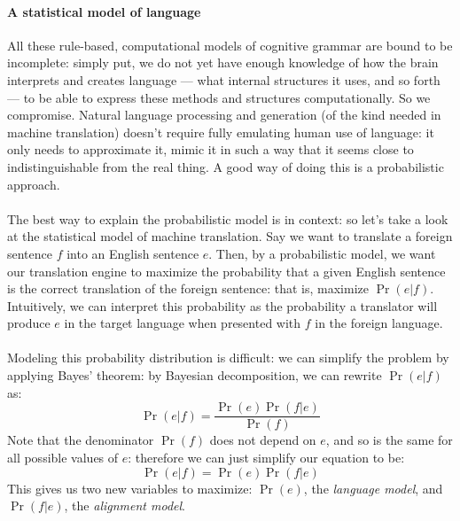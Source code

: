 \paragraph{A statistical model of language}{All these
  rule-based, computational models of cognitive grammar are bound to
  be incomplete: simply put, we do not yet have enough knowledge of
  how the brain interprets and creates language --- what internal
  structures it uses, and so forth --- to be able to express these
  methods and structures computationally. So we compromise. Natural
  language processing and generation (of the kind needed in machine
  translation) doesn't require fully emulating human use of language:
  it only needs to approximate it, mimic it in such a way that it
  seems close to indistinguishable from the real thing. A good way of
  doing this is a probabilistic approach.}
\paragraph{}{The best way to explain the probabilistic model is in
  context: so let's take a look at the statistical model of machine
  translation. Say we want to translate a foreign sentence $f$ into an
  English sentence $e$. Then, by a probabilistic model\cite{smt}, we
  want our translation engine to maximize the probability that a given
  English sentence is the correct translation of the foreign sentence:
  that is, maximize $ \Pr(e|f) $. Intuitively, we can interpret this
  probability as the probability a translator will produce $e$ in the
  target language when presented with $f$ in the foreign
  language.\cite{ibm}}
\paragraph{}{Modeling this probability distribution is difficult: we
  can simplify the problem by applying Bayes' theorem\cite{bayes}: by
  Bayesian decomposition, we can rewrite $\Pr(e|f)$ as:
  $$ \Pr(e|f)=\frac{\Pr(e)\Pr(f|e)}{\Pr(f)}$$ Note that the
  denominator $\Pr(f)$ does not depend on $e$, and so is the same for
  all possible values of $e$: therefore we can just simplify our
  equation to be: $$ \Pr(e|f)= \Pr(e)\Pr(f|e)$$ This gives us two new
  variables to maximize: $\Pr(e)$, the {\it language model}, and
  $\Pr(f|e)$, the {\it alignment model}.}

